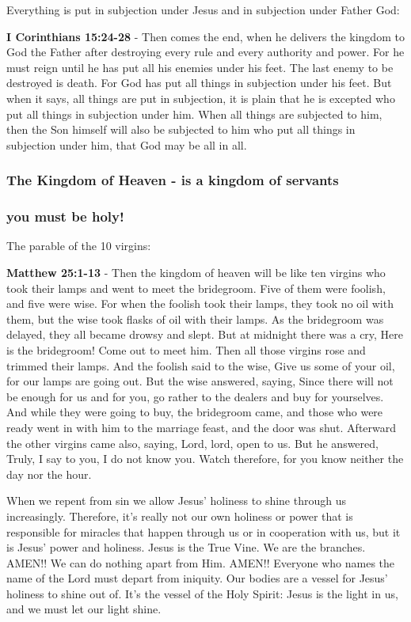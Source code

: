 \documentclass[11pt]{article}
\begin{document}
Everything is put in subjection under Jesus and in subjection under Father God:

\textbf{I Corinthians 15:24-28} - Then comes the end, when he delivers the kingdom to God the Father after destroying every rule and every authority and power. For he must reign until he has put all his enemies under his feet. The last enemy to be destroyed is death. For God has put all things in subjection under his feet. But when it says, all things are put in subjection, it is plain that he is excepted who put all things in subjection under him. When all things are subjected to him, then the Son himself will also be subjected to him who put all things in subjection under him, that God may be all in all.

\subsubsection{The Kingdom of Heaven - is a kingdom of servants}
\label{sec:org855c11f}
\subsubsection{you must be holy!}
\label{sec:org2402396}
The parable of the 10 virgins:

\textbf{Matthew 25:1-13} - Then the kingdom of heaven will be like ten virgins who took their lamps and went to meet the bridegroom. Five of them were foolish, and five were wise. For when the foolish took their lamps, they took no oil with them, but the wise took flasks of oil with their lamps. As the bridegroom was delayed, they all became drowsy and slept. But at midnight there was a cry, Here is the bridegroom! Come out to meet him. Then all those virgins rose and trimmed their lamps. And the foolish said to the wise, Give us some of your oil, for our lamps are going out. But the wise answered, saying, Since there will not be enough for us and for you, go rather to the dealers and buy for yourselves. And while they were going to buy, the bridegroom came, and those who were ready went in with him to the marriage feast, and the door was shut. Afterward the other virgins came also, saying, Lord, lord, open to us. But he answered, Truly, I say to you, I do not know you. Watch therefore, for you know neither the day nor the hour.

When we repent from sin we allow Jesus' holiness to shine through us increasingly.
Therefore, it's really not our own holiness or power that is responsible for miracles that happen through us or in cooperation with us, but it is Jesus' power and holiness.
Jesus is the True Vine. We are the branches. AMEN!! We can do nothing apart from Him. AMEN!!
Everyone who names the name of the Lord must depart from iniquity.
Our bodies are a vessel for Jesus' holiness to shine out of. It's the vessel of the Holy Spirit:
Jesus is the light in us, and we must let our light shine.
\end{document}
